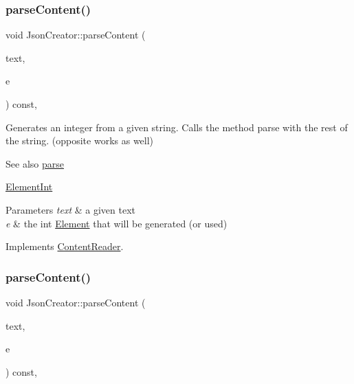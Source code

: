 \subsubsection{\texorpdfstring{parse\+Content()}{parseContent()}\hspace{0.1cm}{\footnotesize\ttfamily [1/6]}}
{\footnotesize\ttfamily void Json\+Creator\+::parse\+Content (\begin{DoxyParamCaption}\item[{std\+::string \&}]{text,  }\item[{\mbox{\hyperlink{classElementInt}{Element\+Int}} $\ast$}]{e }\end{DoxyParamCaption}) const\hspace{0.3cm}{\ttfamily [override]}, {\ttfamily [virtual]}}

Generates an integer from a given string. Calls the method parse with the rest of the string. (opposite works as well) \begin{DoxySeeAlso}{See also}
\mbox{\hyperlink{classJsonCreator_a505ff309c6b144d29478804b0e187c6f}{parse}} 

\mbox{\hyperlink{classElementInt}{Element\+Int}}
\end{DoxySeeAlso}

\begin{DoxyParams}{Parameters}
{\em text} & a given text \\
\hline
{\em e} & the int \mbox{\hyperlink{classElement}{Element}} that will be generated (or used) \\
\hline
\end{DoxyParams}


Implements \mbox{\hyperlink{classContentReader_a7eef37b8b9761e21c0a3907ff94c72f7}{Content\+Reader}}.

\mbox{\label{classJsonCreator_acf8d7cd3dcbb669fd9eb5dec95e069f3}} 
\subsubsection{\texorpdfstring{parse\+Content()}{parseContent()}\hspace{0.1cm}{\footnotesize\ttfamily [2/6]}}
{\footnotesize\ttfamily void Json\+Creator\+::parse\+Content (\begin{DoxyParamCaption}\item[{std\+::string \&}]{text,  }\item[{\mbox{\hyperlink{classElementString}{Element\+String}} $\ast$}]{e }\end{DoxyParamCaption}) const\hspace{0.3cm}{\ttfamily [override]}, {\ttfamily [virtual]}}

